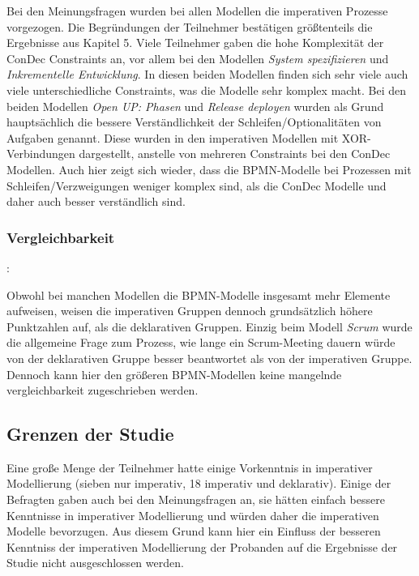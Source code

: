 Bei den Meinungsfragen wurden bei allen Modellen die imperativen Prozesse vorgezogen. Die Begründungen der Teilnehmer bestätigen größtenteils die Ergebnisse aus Kapitel 5. Viele Teilnehmer gaben die hohe Komplexität der ConDec Constraints an, vor allem bei den Modellen \textit{System spezifizieren} und \textit{Inkrementelle Entwicklung}. In diesen beiden Modellen finden sich sehr viele auch viele unterschiedliche Constraints, was die Modelle sehr komplex macht.\newline
Bei den beiden Modellen \textit{Open UP: Phasen} und \textit{Release deployen} wurden als Grund hauptsächlich die bessere Verständlichkeit der Schleifen/Optionalitäten von Aufgaben genannt. Diese wurden in den imperativen Modellen mit XOR-Verbindungen dargestellt, anstelle von mehreren Constraints bei den ConDec Modellen. Auch hier zeigt sich wieder, dass die BPMN-Modelle bei Prozessen mit Schleifen/Verzweigungen weniger komplex sind, als die ConDec Modelle und daher auch besser verständlich sind.\newline


\subsubsection{Vergleichbarkeit}: 

Obwohl bei manchen Modellen die BPMN-Modelle insgesamt mehr Elemente aufweisen, weisen die imperativen Gruppen dennoch grundsätzlich höhere Punktzahlen auf, als die deklarativen Gruppen. Einzig beim Modell \textit{Scrum} wurde die allgemeine Frage zum Prozess, wie lange ein Scrum-Meeting dauern würde von der deklarativen Gruppe besser beantwortet als von der imperativen Gruppe. Dennoch kann hier den größeren BPMN-Modellen keine mangelnde vergleichbarkeit zugeschrieben werden.\newline



\subsection{Grenzen der Studie}

Eine große Menge der Teilnehmer hatte einige Vorkenntnis in imperativer Modellierung (sieben nur imperativ, 18 imperativ und deklarativ). Einige der Befragten gaben auch bei den Meinungsfragen an, sie hätten einfach bessere Kenntnisse in imperativer Modellierung und würden daher die imperativen Modelle bevorzugen. Aus diesem Grund kann hier ein Einfluss der besseren Kenntniss der imperativen Modellierung der Probanden auf die Ergebnisse der Studie nicht ausgeschlossen werden. \newline

 










